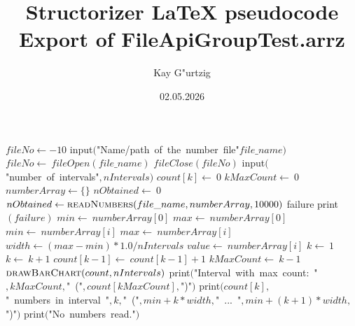 \documentclass[a4paper,10pt]{article}
\title{Structorizer LaTeX pseudocode Export of FileApiGroupTest.arrz}
\author{Kay G"urtzig}
\date{02.05.2026}
\begin{document}
\begin{algorithm}
\caption{DrawRandomHistogram}
\begin{algorithmic}[5]
\State {}
\State {}
  \State \(fileNo\gets-10\)
  \Repeat
    \State \(\)input\((\)"{}Name/path\ of\ the\ number\ file"{}\(file\_name)\)
    \State \(fileNo\gets\ fileOpen(file\_name)\)
    \State \(fileClose(fileNo)\)
    \State \(\)input\((\)"{}number\ of\ intervals"{}\(,nIntervals)\)
      \State \(count[k]\gets\ 0\)
    \EndFor
    \State \(kMaxCount\gets\ 0\)
    \State \(numberArray\gets\{\}\)
    \State \(nObtained\gets\ 0\)
    \Try
      \State \(nObtained\gets\Call{readNumbers}{file\_name,numberArray,10000}\)
    \EndTry
    \Catch failure
      \State \(\)print\((failure)\)
    \EndCatch %
      \State \(min\gets\ numberArray[0]\)
      \State \(max\gets\ numberArray[0]\)
          \State \(min\gets\ numberArray[i]\)
        \Else
            \State \(max\gets\ numberArray[i]\)
          \EndIf
        \EndIf
      \EndFor
      \State \(width\gets(max-min)*1.0/nIntervals\)
        \State \(value\gets\ numberArray[i]\)
        \State \(k\gets\ 1\)
          \State \(k\gets\ k+1\)
        \EndWhile
        \State \(count[k-1]\gets\ count[k-1]+1\)
          \State \(kMaxCount\gets\ k-1\)
        \EndIf
      \EndFor
      \State \(\Call{drawBarChart}{count,nIntervals}\)
      \State \(\)print\((\)"{}Interval\ with\ max\ count:\ "{}\(,kMaxCount,\)"{}\ ("{}\(,count[kMaxCount],\)"{})"{}\()\)
        \State \(\)print\((count[k],\)"{}\ numbers\ in\ interval\ "{}\(,k,\)"{}\ ("{}\(,min+k*width,\)"{}\ ...\ "{}\(,min+(k+1)*width,\)"{})"{}\()\)
      \EndFor
    \Else
      \State \(\)print\((\)"{}No\ numbers\ read."{}\()\)
    \EndIf
  \EndIf
\EndProcedure
\end{algorithmic}
\end{algorithm}
\end{document}
